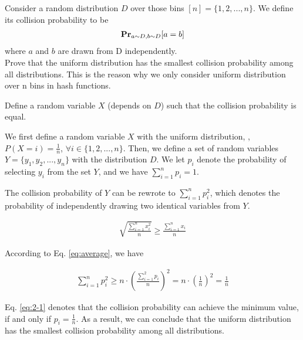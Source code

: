 \begin{problem}[20 points.] Consider a random distribution $D$ over those bins $[n] = \{1, 2, ..., n\}$. We define its collision probability to be
\begin{equation}
\begin{aligned}
\mathbf{Pr}_{a \sim D, b \sim D}{[a = b]} \notag
\end{aligned}
\end{equation}
where $a$ and $b$ are drawn from D independently.  \\
Prove that the uniform distribution has the smallest collision probability among all distributions.
This is the reason why we only consider uniform distribution over n bins in hash functions.

\begin{hint}
Define a random variable $X$ (depends on $D$) such that the collision probability is equal.
\end{hint}

\Answer

We first define a random variable $X$ with the uniform distribution, \ie, $P(X = i) = \frac{1}{n}$, $\forall i \in \{1, 2, ..., n\}$. Then, we define a set of random variables $Y=\{y_1, y_2, ..., y_n\}$ with the distribution $D$. We let $p_i$ denote the probability of selecting $y_i$ from the set $Y$, and we have $\sum_{i=1}^n p_i =1$.

The collision probability of $Y$ can be rewrote to $\sum_{i=1}^n p_i^2$, which denotes the probability of independently drawing two identical variables from $Y$.

\begin{definition}
    \begin{align}\label{eq:average}
        \sqrt{\frac{\sum_{i=1}^n x_i^2}{n}} \geq \frac{\sum_{i=1}^n x_i}{n}
    \end{align}
\end{definition}

According to Eq. \eqref{eq:average}, we have 

\begin{align}\label{eq:2-1}
    \sum_{i=1}^n p_i^2 \geq n \cdot (\frac{\sum_{i=1}^2 p_i}{n})^2= n \cdot (\frac{1}{n})^2 = \frac{1}{n}
\end{align}

Eq. \eqref{eq:2-1} denotes that the collision probability can achieve the minimum value, if and only if $p_i=\frac{1}{n}$. As a result, we can conclude that the uniform distribution has the smallest collision probability among all distributions.
\end{problem}

